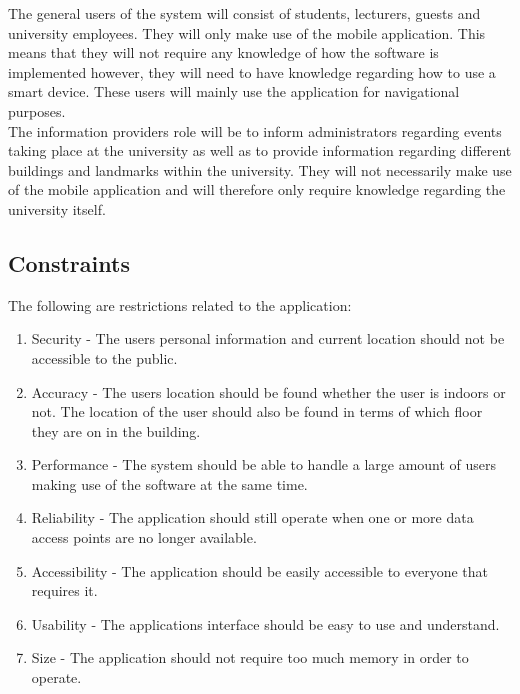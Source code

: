 \documentclass[11pt, a4paper]{article}
\begin{document}
	The general users of the system will consist of students,  lecturers,  guests and university employees. They will only make use of the mobile application. This means that they will not require any knowledge of how the software is implemented however,  they will need to have knowledge regarding how to use a smart device. These users will mainly use the application for navigational purposes.
	\\

	The information providers role will be to inform administrators regarding events taking place at the university as well as to provide information regarding different buildings and landmarks within the university. They will not necessarily make use of the mobile application and will therefore only require knowledge regarding the university itself.

	\subsection{Constraints}
	The following are restrictions related to the application:
		\begin{enumerate}
				\renewcommand{\labelenumi}{{\textbf{\arabic{enumi}.}}}
				\item Security  - The users personal information and current location should not be accessible to the public.
				\item Accuracy - The users location should be found whether the user is indoors or not. The location of the user should also be found in terms of which floor they are on in the building.
				\item Performance - The system should be able to handle a large amount of users making use of the software at the same time.
				\item Reliability - The application should still operate when one or more data access points are no longer available.
				\item Accessibility - The application should be easily accessible to everyone that requires it.
				\item Usability - The applications interface should be easy to use and understand.
				\item Size - The application should not require too much memory in order to operate.
				\end{enumerate}
	\newpage
\end{document}
